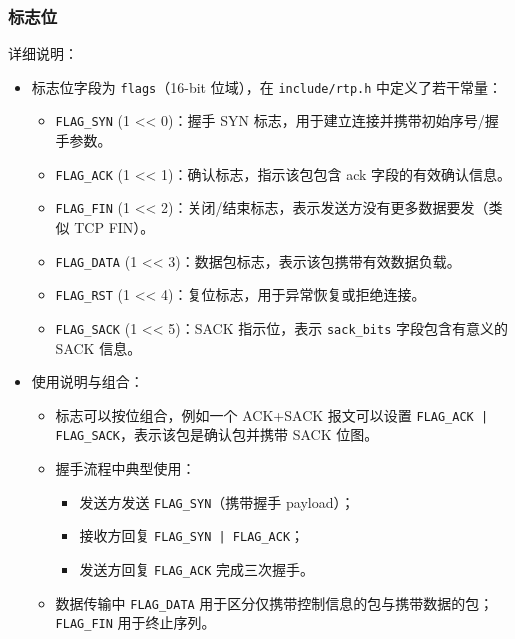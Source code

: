 \documentclass[11pt,a4paper]{article}
\begin{document}
\subsubsection{标志位}
详细说明：
\begin{itemize}
  \item 标志位字段为 \texttt{flags}（16-bit 位域），在 \texttt{include/rtp.h} 中定义了若干常量：
    \begin{itemize}
      \item \texttt{FLAG\_SYN} (1 << 0)：握手 SYN 标志，用于建立连接并携带初始序号/握手参数。
      \item \texttt{FLAG\_ACK} (1 << 1)：确认标志，指示该包包含 ack 字段的有效确认信息。
      \item \texttt{FLAG\_FIN} (1 << 2)：关闭/结束标志，表示发送方没有更多数据要发（类似 TCP FIN）。
      \item \texttt{FLAG\_DATA} (1 << 3)：数据包标志，表示该包携带有效数据负载。
      \item \texttt{FLAG\_RST} (1 << 4)：复位标志，用于异常恢复或拒绝连接。
      \item \texttt{FLAG\_SACK} (1 << 5)：SACK 指示位，表示 \texttt{sack\_bits} 字段包含有意义的 SACK 信息。
    \end{itemize}
  \item 使用说明与组合：
    \begin{itemize}
      \item 标志可以按位组合，例如一个 ACK+SACK 报文可以设置 \texttt{FLAG\_ACK | FLAG\_SACK}，表示该包是确认包并携带 SACK 位图。
      \item 握手流程中典型使用：
        \begin{itemize}
          \item 发送方发送 \texttt{FLAG\_SYN}（携带握手 payload）；
          \item 接收方回复 \texttt{FLAG\_SYN | FLAG\_ACK}；
          \item 发送方回复 \texttt{FLAG\_ACK} 完成三次握手。
        \end{itemize}
      \item 数据传输中 \texttt{FLAG\_DATA} 用于区分仅携带控制信息的包与携带数据的包；\texttt{FLAG\_FIN} 用于终止序列。
    \end{itemize}
\end{itemize}
\end{document}
